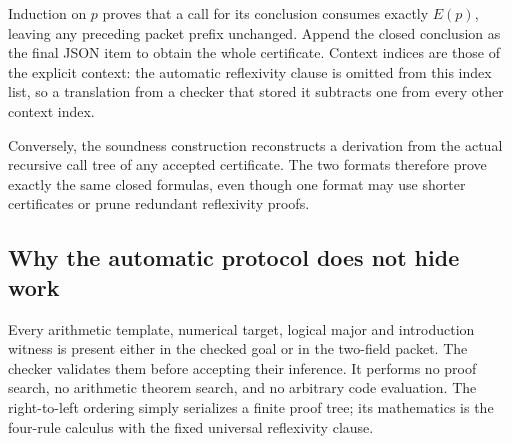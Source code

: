 Induction on \(p\) proves that a call for its conclusion consumes
exactly \(E(p)\), leaving any preceding packet prefix unchanged.
Append the closed conclusion as the final JSON item to obtain the
whole certificate. Context indices are those of the explicit context:
the automatic reflexivity clause is omitted from this index list, so
a translation from a checker that stored it subtracts one from every
other context index.

Conversely, the soundness construction reconstructs a derivation from
the actual recursive call tree of any accepted certificate. The two
formats therefore prove exactly the same closed formulas, even though
one format may use shorter certificates or prune redundant reflexivity
proofs.

\subsection{Why the automatic protocol does not hide work}
Every arithmetic template, numerical target, logical major and
introduction witness is present either in the checked goal or in the
two-field packet. The checker validates them before accepting their
inference. It performs no proof search, no arithmetic theorem search,
and no arbitrary code evaluation. The right-to-left ordering simply
serializes a finite proof tree; its mathematics is the four-rule
calculus with the fixed universal reflexivity clause.

